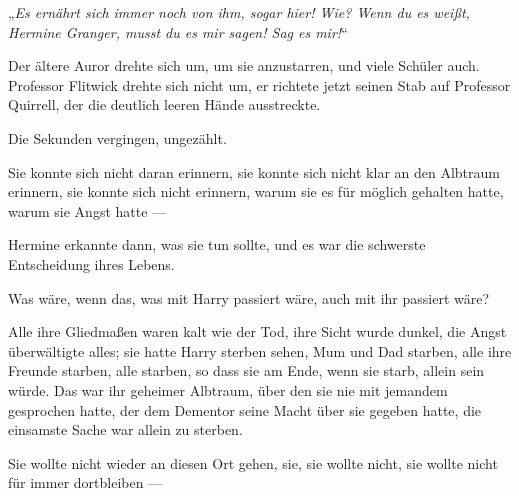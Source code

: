 „\emph{Es ernährt sich immer noch von ihm, sogar hier! Wie? Wenn du es weißt, Hermine Granger, musst du es mir sagen! Sag es mir!}“

Der ältere Auror drehte sich um, um sie anzustarren, und viele Schüler auch. Professor Flitwick drehte sich nicht um, er richtete jetzt seinen Stab auf Professor Quirrell, der die deutlich leeren Hände ausstreckte.

Die Sekunden vergingen, ungezählt.

Sie konnte sich nicht daran erinnern, sie konnte sich nicht klar an den Albtraum erinnern, sie konnte sich nicht erinnern, warum sie es für möglich gehalten hatte, warum sie Angst hatte —

Hermine erkannte dann, was sie tun sollte, und es war die schwerste Entscheidung ihres Lebens.

Was wäre, wenn das, was mit Harry passiert wäre, auch mit ihr passiert wäre?

Alle ihre Gliedmaßen waren kalt wie der Tod, ihre Sicht wurde dunkel, die Angst überwältigte alles; sie hatte Harry sterben sehen, Mum und Dad starben, alle ihre Freunde starben, alle starben, so dass sie am Ende, wenn sie starb, allein sein würde. Das war ihr geheimer Albtraum, über den sie nie mit jemandem gesprochen hatte, der dem Dementor seine Macht über sie gegeben hatte, die einsamste Sache war allein zu sterben.

Sie wollte nicht wieder an diesen Ort gehen, sie, sie wollte nicht, sie wollte nicht für immer dortbleiben —

